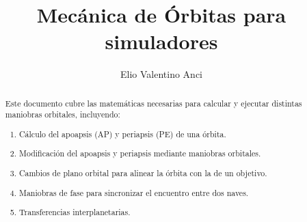 \documentclass[a4paper]{report}
\title{Mecánica de Órbitas para simuladores}
\author{Elio Valentino Anci}
\begin{document}
  \maketitle

  \begin{abstract}
    Este documento cubre las matemáticas necesarias para calcular y ejecutar distintas maniobras orbitales, incluyendo:
    \begin{enumerate}
      \item Cálculo del apoapsis (AP) y periapsis (PE) de una órbita.
      \item Modificación del apoapsis y periapsis mediante maniobras orbitales.
      \item Cambios de plano orbital para alinear la órbita con la de un objetivo.
      \item Maniobras de fase para sincronizar el encuentro entre dos naves.
      \item Transferencias interplanetarias.
    \end{enumerate}
  \end{abstract}

  \tableofcontents

  
  
  
  

  

  \printbibliography
\end{document}
